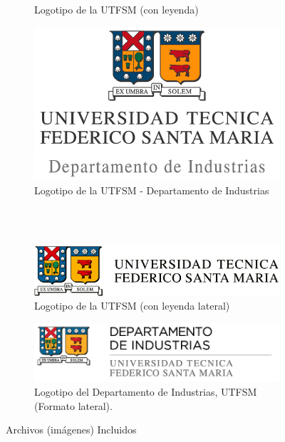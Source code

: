 \begin{figure}[ht!]
\begin{subfigure}[b]{0.4\textwidth}
        \caption{Logotipo de la UTFSM (con leyenda)}
        \label{fig:logousm_leyenda}
        \end{subfigure}%
        \hfill
        \begin{subfigure}[b]{0.4\textwidth}
        \centering
        \includegraphics[width = .8\textwidth]{figures/logousmind.jpg}
        \caption{Logotipo de la UTFSM - Departamento de Industrias}
        \label{fig:logousm_industrias}
        \end{subfigure}%
        \\
        \bigskip
        \\
        \begin{subfigure}[b]{0.4\textwidth}
        \centering
        \includegraphics[width = .9\textwidth]{figures/logousm-lateral}
        \caption{Logotipo de la UTFSM (con leyenda lateral)}
        \label{fig:logousm_leyenda_lateral}
        \end{subfigure}%
        \hfill
        \begin{subfigure}[b]{0.4\textwidth}
        \centering
        \includegraphics[width=.9\textwidth]{figures/logo_utfsm_di.png}
        \caption{Logotipo del Departamento de Industrias, UTFSM (Formato lateral).}
        \label{fig:logousm_industrias_lateral}
        \end{subfigure}%
        \caption {Archivos (imágenes) Incluidos}
    \end{figure}

